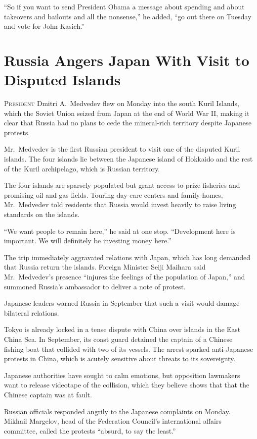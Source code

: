 ﻿\documentclass[12pt]{article}
\begin{document}
``So if you want to send President Obama a message about spending and about takeovers and bailouts
and all the nonsense,'' he added, ``go out there on Tuesday and vote for John Kasich.''

\section{Russia Angers Japan With Visit to Disputed Islands}

\lettrine{P}{resident} Dmitri A.~Medvedev flew on Monday into the south
Kuril Islands, which the Soviet Union seized from Japan at the end of World War II, making it clear
that Russia had no plans to cede the mineral-rich territory despite Japanese protests.

Mr.~Medvedev is the first Russian president to visit one of the disputed Kuril islands. The four
islands lie between the Japanese island of Hokkaido and the rest of the Kuril archipelago, which is
Russian territory.

The four islands are sparsely populated but grant access to prize fisheries and promising oil and
gas fields. Touring day-care centers and family homes, Mr.~Medvedev told residents that Russia would
invest heavily to raise living standards on the islands.

``We want people to remain here,'' he said at one stop. ``Development here is important. We will
definitely be investing money here.''

The trip immediately aggravated relations with Japan, which has long demanded that Russia return the
islands. Foreign Minister Seiji Maihara said Mr.~Medvedev's presence ``injures the feelings of the
population of Japan,'' and summoned Russia's ambassador to deliver a note of protest.

Japanese leaders warned Russia in September that such a visit would damage bilateral relations.

Tokyo is already locked in a tense dispute with China over islands in the East China Sea. In
September, its coast guard detained the captain of a Chinese fishing boat that collided with two of
its vessels. The arrest sparked anti-Japanese protests in China, which is acutely sensitive about
threats to its sovereignty.

Japanese authorities have sought to calm emotions, but opposition lawmakers want to release
videotape of the collision, which they believe shows that that the Chinese captain was at fault.

Russian officials responded angrily to the Japanese complaints on Monday. Mikhail Margelov, head of
the Federation Council's international affairs committee, called the protests ``absurd, to say the
least.''
\end{document}
